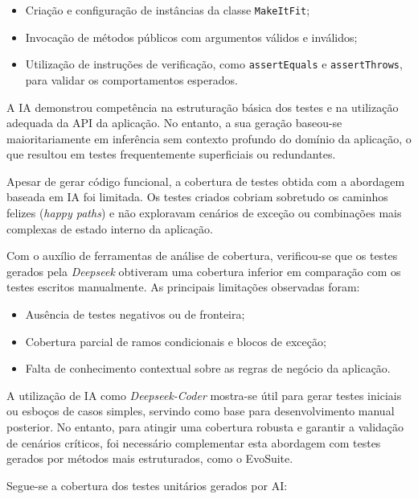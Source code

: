 \documentclass[12pt, a4paper]{article}
\begin{document}
\begin{itemize}
  \item Criação e configuração de instâncias da classe \texttt{MakeItFit};
  \item Invocação de métodos públicos com argumentos válidos e inválidos;
  \item Utilização de instruções de verificação, como \texttt{assertEquals} e \texttt{assertThrows},
  para validar os comportamentos esperados.
\end{itemize}

A IA demonstrou competência na estruturação básica dos testes e na utilização adequada da API da
aplicação. No entanto, a sua geração baseou-se maioritariamente em inferência sem contexto profundo
do domínio da aplicação, o que resultou em testes frequentemente superficiais ou redundantes.

Apesar de gerar código funcional, a cobertura de testes obtida com a abordagem baseada em IA foi
limitada. Os testes criados cobriam sobretudo os caminhos felizes (\textit{happy paths}) e não
exploravam cenários de exceção ou combinações mais complexas de estado interno da aplicação.

Com o auxílio de ferramentas de análise de cobertura, verificou-se que os testes gerados pela
\textit{Deepseek} obtiveram uma cobertura inferior em comparação com os testes escritos manualmente.
As principais limitações observadas foram:

\begin{itemize}
  \item Ausência de testes negativos ou de fronteira;
  \item Cobertura parcial de ramos condicionais e blocos de exceção;
  \item Falta de conhecimento contextual sobre as regras de negócio da aplicação.
\end{itemize}

A utilização de IA como \textit{Deepseek-Coder} mostra-se útil para gerar testes iniciais ou esboços
de casos simples, servindo como base para desenvolvimento manual posterior. No entanto, para atingir
uma cobertura robusta e garantir a validação de cenários críticos, foi necessário complementar esta
abordagem com testes gerados por métodos mais estruturados, como o EvoSuite.

Segue-se a cobertura dos testes unitários gerados por AI:
\end{document}
